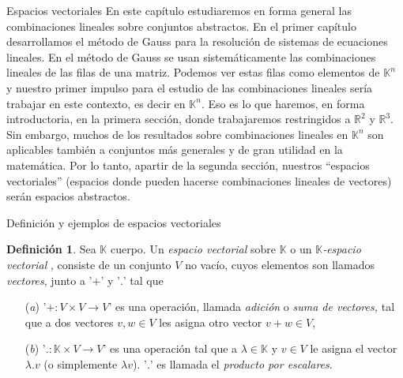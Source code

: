 \documentclass[a4paper,12pt,twoside,spanish]{amsbook}
\theoremstyle{definition}
\newtheorem{definicion}{Definici\'on}[section]
\theoremstyle{remark}
\newcommand{\R}{\mathbb R}
\newcommand{\K}{\mathbb K}
\begin{document}
	\begin{chapter}{Espacios vectoriales}\label{chap-esp-vect} En este capítulo estudiaremos en forma general las combinaciones lineales sobre conjuntos abstractos.
		En el primer capítulo desarrollamos el método de Gauss para la resolución de sistemas de ecuaciones lineales. En el método de Gauss se usan sistemáticamente las combinaciones lineales de las filas de una matriz. Podemos ver estas filas como elementos de $\K^n$  y nuestro primer impulso para el estudio de las combinaciones lineales sería trabajar en este contexto, es decir  en $\K^n$. Eso es lo que haremos, en forma introductoria, en la primera sección, donde trabajaremos restringidos a   $\R^2$ y $\R^3$.   Sin embargo, muchos de los resultados sobre combinaciones lineales en $\K^n$ son aplicables también a conjuntos más generales y de gran utilidad en la matemática. Por lo tanto,  apartir de la segunda sección,  nuestros ``espacios vectoriales'' (espacios donde pueden hacerse combinaciones lineales de vectores) serán espacios abstractos. 
		

		

		
		\begin{section}{Definición y ejemplos de espacios vectoriales}
			
			\begin{definicion}\label{def-esp-vect} Sea $\K$ cuerpo. Un \textit{espacio vectorial} sobre $\K$ o un \textit{$\K$-espacio vectorial }, consiste de  un  conjunto $V$ no vacío, cuyos elementos son llamados \textit{vectores}, junto a  '$+$' y '$.$' tal que
				\begin{enumerate}
					\item[(\textit{a})] '$+\colon V\times V\to V$' es una operación, llamada \textit{adición} o  \textit{suma de vectores,} tal que a dos vectores $v,w \in V$ les asigna otro vector $v+w \in V$,
					\item[(\textit{b})]  '$.
                     \colon \K\times V\to V$' es una operación tal que a $\lambda \in \K$ y $v \in V$ le asigna el vector $\lambda.v$ (o simplemente $\lambda v$).  '$.$' es llamada  el \textit{producto por escalares}.
					

\end{enumerate}
\end{definicion}
\end{section}
\end{chapter}
\end{document}
